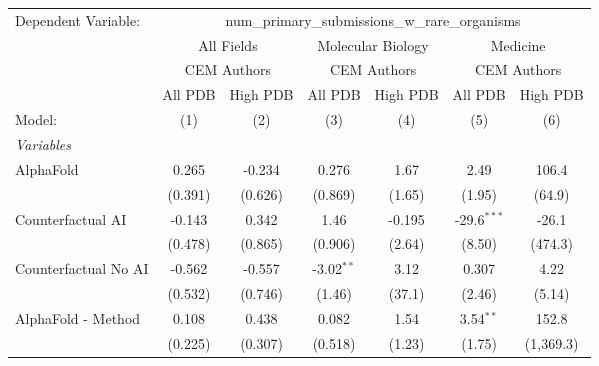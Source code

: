 \begingroup
\centering
\begin{tabular}{lcccccc}
   \tabularnewline \midrule \midrule
   Dependent Variable: & \multicolumn{6}{c}{num\_primary\_submissions\_w\_rare\_organisms}\\
 & \multicolumn{2}{c}{All Fields} & \multicolumn{2}{c}{Molecular Biology} & \multicolumn{2}{c}{Medicine} \\
\cmidrule(lr){2-3} \cmidrule(lr){4-5} \cmidrule(lr){6-7}
 & \multicolumn{2}{c}{CEM Authors} & \multicolumn{2}{c}{CEM Authors} & \multicolumn{2}{c}{CEM Authors} \\
\cmidrule(lr){2-3} \cmidrule(lr){4-5} \cmidrule(lr){6-7}
 & \multicolumn{1}{c}{All PDB} & \multicolumn{1}{c}{High PDB} & \multicolumn{1}{c}{All PDB} & \multicolumn{1}{c}{High PDB} & \multicolumn{1}{c}{All PDB} & \multicolumn{1}{c}{High PDB} \\
\cmidrule(lr){2-2} \cmidrule(lr){3-3} \cmidrule(lr){4-4} \cmidrule(lr){5-5} \cmidrule(lr){6-6} \cmidrule(lr){7-7}
   Model:                                                     & (1)     & (2)           & (3)          & (4)    & (5)           & (6)\\  
   \midrule
   \emph{Variables}\\
   AlphaFold                                                  & 0.265   & -0.234        & 0.276        & 1.67   & 2.49          & 106.4\\   
                                                              & (0.391) & (0.626)       & (0.869)      & (1.65) & (1.95)        & (64.9)\\   
   Counterfactual AI                                          & -0.143  & 0.342         & 1.46         & -0.195 & -29.6$^{***}$ & -26.1\\   
                                                              & (0.478) & (0.865)       & (0.906)      & (2.64) & (8.50)        & (474.3)\\   
   Counterfactual No AI                                       & -0.562  & -0.557        & -3.02$^{**}$ & 3.12   & 0.307         & 4.22\\   
                                                              & (0.532) & (0.746)       & (1.46)       & (37.1) & (2.46)        & (5.14)\\   
   AlphaFold - Method                                         & 0.108   & 0.438         & 0.082        & 1.54   & 3.54$^{**}$   & 152.8\\   
                                                              & (0.225) & (0.307)       & (0.518)      & (1.23) & (1.75)        & (1,369.3)\\   

\end{tabular}
